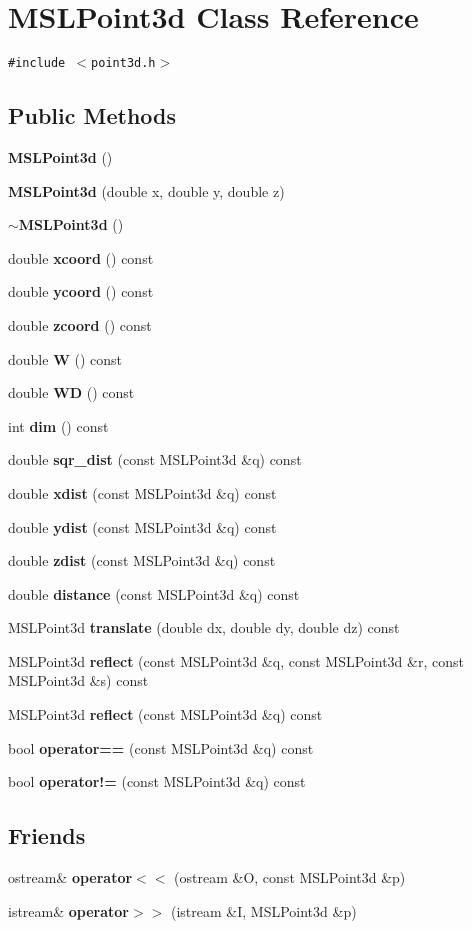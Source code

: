 \section{MSLPoint3d  Class Reference}
\label{classMSLPoint3d}
{\tt \#include $<$point3d.h$>$}

\subsection*{Public Methods}
\begin{CompactItemize}
\item 
{\bf MSLPoint3d} ()
\item 
{\bf MSLPoint3d} (double x, double y, double z)
\item 
{\bf $\sim$MSLPoint3d} ()
\item 
double {\bf xcoord} () const
\item 
double {\bf ycoord} () const
\item 
double {\bf zcoord} () const
\item 
double {\bf W} () const
\item 
double {\bf WD} () const
\item 
int {\bf dim} () const
\item 
double {\bf sqr\_\-dist} (const MSLPoint3d \&q) const
\item 
double {\bf xdist} (const MSLPoint3d \&q) const
\item 
double {\bf ydist} (const MSLPoint3d \&q) const
\item 
double {\bf zdist} (const MSLPoint3d \&q) const
\item 
double {\bf distance} (const MSLPoint3d \&q) const
\item 
MSLPoint3d {\bf translate} (double dx, double dy, double dz) const
\item 
MSLPoint3d {\bf reflect} (const MSLPoint3d \&q, const MSLPoint3d \&r, const MSLPoint3d \&s) const
\item 
MSLPoint3d {\bf reflect} (const MSLPoint3d \&q) const
\item 
bool {\bf operator==} (const MSLPoint3d \&q) const
\item 
bool {\bf operator!=} (const MSLPoint3d \&q) const
\end{CompactItemize}
\subsection*{Friends}
\begin{CompactItemize}
\item 
ostream\& {\bf operator$<$$<$} (ostream \&O, const MSLPoint3d \&p)
\item 
istream\& {\bf operator$>$$>$} (istream \&I, MSLPoint3d \&p)
\end{CompactItemize}


